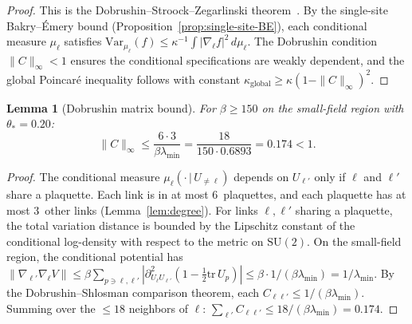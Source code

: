 \documentclass[11pt]{article}
\newtheorem{lemma}[theorem]{Lemma}
\theoremstyle{definition}
\newcommand{\SU}{\mathrm{SU}}
\newcommand{\tr}{\mathrm{tr}}
\begin{document}
\begin{proof}
This is the Dobrushin--Stroock--Zegarlinski
theorem~\cite{StroockZegarlinski}.
By the single-site Bakry--\'Emery bound
(Proposition~\ref{prop:single-site-BE}), each conditional measure
$\mu_\ell$ satisfies $\mathrm{Var}_{\mu_\ell}(f)\le\kappa^{-1}
\int|\nabla_\ell f|^2\,d\mu_\ell$.  The Dobrushin condition
$\|C\|_\infty<1$ ensures the conditional specifications are
weakly dependent, and the global Poincar\'e inequality follows
with constant $\kappa_{\mathrm{global}}\ge\kappa(1-\|C\|_\infty)^2$.
\end{proof}

\begin{lemma}[Dobrushin matrix bound]\label{lem:dobrushin-bound}
For $\beta\ge 150$ on the small-field region with $\theta_*=0.20$:
\begin{equation}
\|C\|_\infty\le\frac{6\cdot 3}{\beta\lambda_{\min}}
=\frac{18}{150\cdot 0.6893}=0.174<1.
\end{equation}
\end{lemma}

\begin{proof}
The conditional measure $\mu_\ell(\cdot\,|\,U_{\neq\ell})$ depends
on $U_{\ell'}$ only if $\ell$ and $\ell'$ share a plaquette.
Each link is in at most 6~plaquettes, and each plaquette has at most
3~other links (Lemma~\ref{lem:degree}).
For links $\ell,\ell'$ sharing a plaquette, the total variation
distance is bounded by the Lipschitz constant of the conditional
log-density with respect to the metric on $\SU(2)$.  On the
small-field region, the conditional potential has
$\|\nabla_{\ell'}\nabla_\ell V\|
\le\beta\sum_{p\ni\ell,\ell'}|\partial^2_{U_\ell U_{\ell'}}
(1-\frac{1}{2}\tr\,U_p)|
\le\beta\cdot 1/(\beta\lambda_{\min})=1/\lambda_{\min}$.
By the Dobrushin--Shlosman comparison theorem, each
$C_{\ell\ell'}\le 1/(\beta\lambda_{\min})$.  Summing over the
$\le 18$ neighbors of $\ell$:
$\sum_{\ell'}C_{\ell\ell'}\le 18/(\beta\lambda_{\min})=0.174$.
\end{proof}
\end{document}

